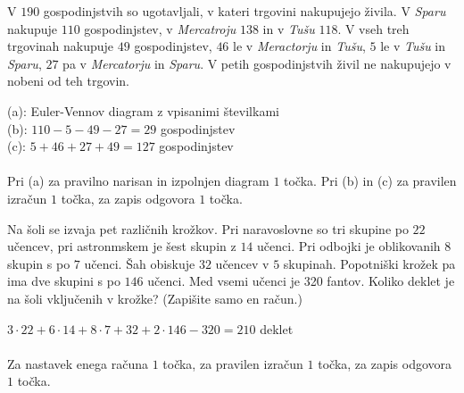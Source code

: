 \documentclass[addpoints]{exam}
\begin{document}
\begin{questions}
    \question
    V $190$ gospodinjstvih so ugotavljali, v kateri trgovini nakupujejo živila. V \textit{Sparu} nakupuje $110$ gospodinjstev, v \textit{Mercatroju} $138$ in v \textit{Tušu} $118$.
    V vseh treh trgovinah nakupuje $49$ gospodinjstev, $46$ le v \textit{Meractorju} in \textit{Tušu}, $5$ le v \textit{Tušu} in \textit{Sparu}, $27$ pa v \textit{Mercatorju} in \textit{Sparu}. 
    V petih gospodinjstvih živil ne nakupujejo v nobeni od teh trgovin.

    \begin{solution}[8cm]
        (a): Euler-Vennov diagram z vpisanimi številkami \\
        (b): $110-5-49-27=29$ gospodinjstev\\
        (c): $5+46+27+49=127$ gospodinjstev \\ \\
        Pri (a) za pravilno narisan in izpolnjen diagram $1$ točka. Pri (b) in (c) za pravilen izračun $1$ točka, za zapis odgovora $1$ točka.
    \end{solution}




     \newpage
        

    \question[3]
    Na šoli se izvaja pet različnih krožkov. Pri naravoslovne so tri skupine po $22$ učencev, pri astronmskem je šest skupin z $14$ učenci. Pri odbojki je oblikovanih $8$ skupin s po $7$ učenci. Šah obiskuje $32$ učencev v $5$ skupinah. Popotniški krožek pa ima dve skupini s po $146$ učenci.
    Med vsemi učenci je 320 fantov. Koliko deklet je na šoli vključenih v krožke? (Zapišite samo en račun.)

    \begin{solution}[8cm]
        $3\cdot 22+6\cdot 14+8\cdot 7+32+2\cdot 146-320=210$ deklet \\ \\
        Za nastavek enega računa $1$ točka, za pravilen izračun $1$ točka, za zapis odgovora $1$ točka.
    \end{solution}


\end{questions}
\end{document}
